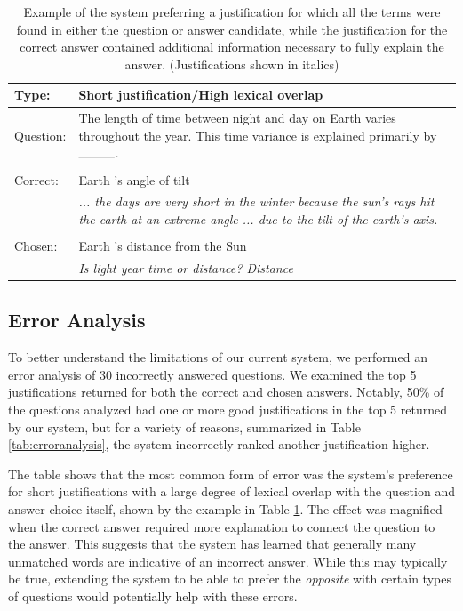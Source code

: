 \begin{table}[t]
\begin{center}
\begin{tabular}{p{2cm}p{12cm}}
\hline
Type: & \textbf{Short justification/High lexical overlap}\\
\hline
Question: & The length of time between night and day on Earth varies throughout the year. This time variance is explained primarily by $\rule{1cm}{0.15mm}$. \\
\\
Correct: & Earth 's angle of tilt \\
			 & \textit{ ... the days are very short in the winter because the sun's rays hit the earth at an extreme angle ... due to the tilt of the earth's axis. } \\
\\
Chosen: &  Earth 's distance from the Sun \\
			& \textit{ Is light year time or distance? Distance}	\\
\end{tabular}
\caption{{ Example of the system preferring a justification for which all the terms were found in either the question or answer candidate, while the justification for the correct answer contained additional information necessary to fully explain the answer. 
(Justifications shown in italics)
}} 
\label{tab:ex_lex_overlap}
\end{center}
\end{table}

\subsection{Error Analysis}
\label{sec-emnlp2017:erroranalysis}

To better understand the limitations of our current system, we performed an error analysis of 30 incorrectly answered questions.  
We examined the top 5 justifications returned for both the correct and chosen answers.  
Notably, 50\% of the questions analyzed had one or more good justifications in the top 5 returned by our system, but for a variety of reasons, summarized in Table \ref{tab:erroranalysis}, the system incorrectly ranked another justification higher.  

The table shows that the most common form of error was the system's preference for short justifications with a large degree of lexical overlap with the question and answer choice itself, shown by the example in Table \ref{tab:ex_lex_overlap}.  The effect was magnified when the correct answer required more explanation to connect the question to the answer.  
This suggests that the system has learned that generally many unmatched words are indicative of an incorrect answer.  While this may typically be true, extending the system to be able to prefer the \emph{opposite} with certain types of questions would potentially help with these errors.  

